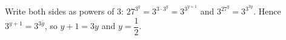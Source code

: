 Write both sides as powers of $3$: $27^{3^y}=3^{3\cdot3^y}=3^{3^{y+1}}$ and $3^{27^y}=3^{3^{3y}}$. Hence $3^{y+1}=3^{3y}$, so $y+1=3y$ and $\boxed{y=\dfrac{1}{2}}$.
